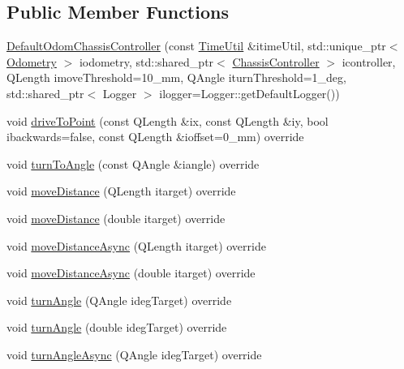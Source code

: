 \subsection*{Public Member Functions}
\begin{DoxyCompactItemize}
\item 
\mbox{\hyperlink{classokapi_1_1DefaultOdomChassisController_a5fe023ef9ccab0532fd29d237bc91677}{Default\+Odom\+Chassis\+Controller}} (const \mbox{\hyperlink{classokapi_1_1TimeUtil}{Time\+Util}} \&itime\+Util, std\+::unique\+\_\+ptr$<$ \mbox{\hyperlink{classokapi_1_1Odometry}{Odometry}} $>$ iodometry, std\+::shared\+\_\+ptr$<$ \mbox{\hyperlink{classokapi_1_1ChassisController}{Chassis\+Controller}} $>$ icontroller, Q\+Length imove\+Threshold=10\+\_\+mm, Q\+Angle iturn\+Threshold=1\+\_\+deg, std\+::shared\+\_\+ptr$<$ Logger $>$ ilogger=\+Logger\+::get\+Default\+Logger())
\item 
void \mbox{\hyperlink{classokapi_1_1DefaultOdomChassisController_a31474749c8a6c0dca45a4c02418fadab}{drive\+To\+Point}} (const Q\+Length \&ix, const Q\+Length \&iy, bool ibackwards=false, const Q\+Length \&ioffset=0\+\_\+mm) override
\item 
void \mbox{\hyperlink{classokapi_1_1DefaultOdomChassisController_aaf6e4d74384b87510d35b639e45f9dc2}{turn\+To\+Angle}} (const Q\+Angle \&iangle) override
\item 
void \mbox{\hyperlink{classokapi_1_1DefaultOdomChassisController_a3143bc60f72ab8ff8f63aad9a810a1c6}{move\+Distance}} (Q\+Length itarget) override
\item 
void \mbox{\hyperlink{classokapi_1_1DefaultOdomChassisController_a42abd53b9a0b96b722186ada8eb13d98}{move\+Distance}} (double itarget) override
\item 
void \mbox{\hyperlink{classokapi_1_1DefaultOdomChassisController_a61ca0d303fcbfd08932157af9adbbb12}{move\+Distance\+Async}} (Q\+Length itarget) override
\item 
void \mbox{\hyperlink{classokapi_1_1DefaultOdomChassisController_ab1abaec33ecce2515895d3a8af363c8c}{move\+Distance\+Async}} (double itarget) override
\item 
void \mbox{\hyperlink{classokapi_1_1DefaultOdomChassisController_a4ba07ac4bea9ff2d8aea30be72f6a0ea}{turn\+Angle}} (Q\+Angle ideg\+Target) override
\item 
void \mbox{\hyperlink{classokapi_1_1DefaultOdomChassisController_a05a8a6684b3afe4f7c2ecbc24699f70d}{turn\+Angle}} (double ideg\+Target) override
\item 
void \mbox{\hyperlink{classokapi_1_1DefaultOdomChassisController_a18d748097a7938e3102638d17be54c76}{turn\+Angle\+Async}} (Q\+Angle ideg\+Target) override

\end{DoxyCompactItemize}
